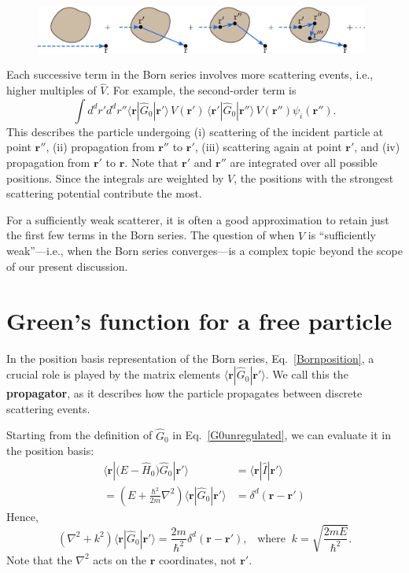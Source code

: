 \documentclass[pra,12pt]{revtex4-2}
\begin{document}
\begin{figure}[h!]
  \centering\includegraphics[width=0.98\textwidth]{bornseries}
\end{figure}

\noindent
Each successive term in the Born series involves more scattering
events, i.e., higher multiples of $\hat{V}$.  For example, the
second-order term is
\begin{equation*}
  \int d^dr' d^dr'' \langle \mathbf{r} | \hat{G}_0 |\mathbf{r}'\rangle\, V(\mathbf{r}') \, \langle \mathbf{r}' | \hat{G}_0 |\mathbf{r}''\rangle \, V(\mathbf{r}'') \psi_i(\mathbf{r}'').
\end{equation*}
This describes the particle undergoing (i) scattering of the incident
particle at point $\mathbf{r}''$, (ii) propagation from $\mathbf{r}''$
to $\mathbf{r}'$, (iii) scattering again at point $\mathbf{r}'$, and
(iv) propagation from $\mathbf{r}'$ to $\mathbf{r}$.  Note that
$\mathbf{r}'$ and $\mathbf{r}''$ are integrated over all possible
positions.  Since the integrals are weighted by $V$, the positions
with the strongest scattering potential contribute the most.

For a sufficiently weak scatterer, it is often a good approximation to
retain just the first few terms in the Born series.  The question of
when $\hat{V}$ is ``sufficiently weak''---i.e., when the Born series
converges---is a complex topic beyond the scope of our present
discussion.

\section{Green's function for a free particle}
\label{sec:freegreen}

In the position basis representation of the Born series,
Eq.~\eqref{Bornposition}, a crucial role is played by the matrix
elements $\langle\mathbf{r}|\hat{G}_0|\mathbf{r}'\rangle$.  We call
this the \textbf{propagator}, as it describes how the particle
propagates between discrete scattering events.

Starting from the definition of $\hat{G}_0$ in
Eq.~\eqref{G0unregulated}, we can evaluate it in the position basis:
\begin{align*}
  \langle\mathbf{r} |\big(E-\hat{H}_0\big) \hat{G}_0 |\mathbf{r}'\rangle &= \langle\mathbf{r}|\hat{I}|\mathbf{r}'\rangle \\
  = \left(E + \frac{\hbar^2}{2m}\nabla^2 \right) \langle\mathbf{r} |\hat{G}_0 |\mathbf{r}'\rangle &= \delta^d(\mathbf{r}-\mathbf{r}')
\end{align*}
Hence,
\begin{equation}
  \left(\nabla^2 + k^2\right) \langle\mathbf{r} |\hat{G}_0 |\mathbf{r}'\rangle = \frac{2m}{\hbar^2} \delta^d(\mathbf{r}-\mathbf{r}'),
  \;\;\; \mathrm{where}\;\; k = \sqrt{\frac{2mE}{\hbar^2}}.
  \label{propagatoreq}
\end{equation}
Note that the $\nabla^2$ acts on the $\mathbf{r}$ coordinates, not
$\mathbf{r}'$.
\end{document}
